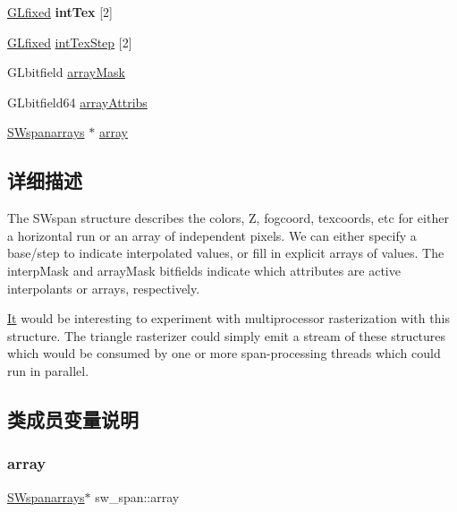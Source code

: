 \begin{DoxyCompactItemize}
\item 
\mbox{\label{structsw__span_ad9936b8a8a022a94030d60a13cede311}} 
\hyperlink{glheader_8h_ad6d3fa892df40dedf48ee6d84529ae5e}{G\+Lfixed} {\bfseries int\+Tex} \mbox{[}2\mbox{]}
\item 
\hyperlink{glheader_8h_ad6d3fa892df40dedf48ee6d84529ae5e}{G\+Lfixed} \hyperlink{structsw__span_a213d92f376d6440a18d29117b89b18f3}{int\+Tex\+Step} \mbox{[}2\mbox{]}
\item 
G\+Lbitfield \hyperlink{structsw__span_a61e6df73a3fef2eb4966716862a625cd}{array\+Mask}
\item 
G\+Lbitfield64 \hyperlink{structsw__span_aed81efc036de89ec02981e9b51efd80b}{array\+Attribs}
\item 
\hyperlink{structsw__span__arrays}{S\+Wspanarrays} $\ast$ \hyperlink{structsw__span_abf4e0e84821f1acc522ebb44ef6d123f}{array}
\end{DoxyCompactItemize}


\subsection{详细描述}
The S\+Wspan structure describes the colors, Z, fogcoord, texcoords, etc for either a horizontal run or an array of independent pixels. We can either specify a base/step to indicate interpolated values, or fill in explicit arrays of values. The interp\+Mask and array\+Mask bitfields indicate which attributes are active interpolants or arrays, respectively.

\hyperlink{class_it}{It} would be interesting to experiment with multiprocessor rasterization with this structure. The triangle rasterizer could simply emit a stream of these structures which would be consumed by one or more span-\/processing threads which could run in parallel. 

\subsection{类成员变量说明}
\mbox{\label{structsw__span_abf4e0e84821f1acc522ebb44ef6d123f}} 
\subsubsection{\texorpdfstring{array}{array}}
{\footnotesize\ttfamily \hyperlink{structsw__span__arrays}{S\+Wspanarrays}$\ast$ sw\+\_\+span\+::array}

